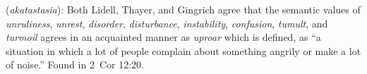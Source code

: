 \item[Uproar,]

(\textit{akatastasia}):
Both Lidell, Thayer, and Gingrich agree that the semantic values of \emph{unruliness}, \emph{unrest}, \emph{disorder}, \emph{disturbance}, \emph{instability},  \emph{confusion}, \emph{tumult}, and \emph{turmoil} agrees in an acquainted manner as \emph{uproar} which is defined, as ``a situation in which a lot of people complain about something angrily or make a lot of noise.''
Found in 2~Cor 12:20.
